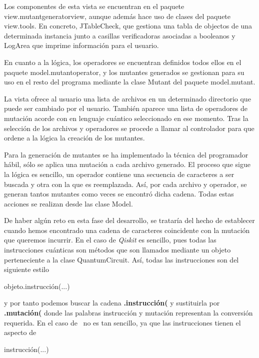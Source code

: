 Los componentes de esta vista se encuentran en el paquete view.mutantgeneratorview, aunque además hace uso de clases del paquete view.tools. En concreto, JTableCheck, que gestiona una tabla de  objectos de una determinada instancia junto a casillas verificadoras asociadas a booleanos y LogArea que imprime información para el usuario.

En cuanto a la lógica, los operadores se encuentran definidos todos ellos en el paquete model.mutantoperator, y los mutantes generados se gestionan para su uso en el resto del programa mediante la clase Mutant del paquete model.mutant.

La vista ofrece al usuario una lista de archivos en un determinado directorio que puede ser cambiado por el usuario. También aparece una lista de operadores de mutación acorde con en lenguaje cuántico seleccionado en ese momento. Tras la selección de los archivos y operadores se procede a llamar al controlador para que ordene a la lógica la creación de los mutantes.

Para la generación de mutantes se ha implementado la técnica del programador hábil, sólo se aplica una mutación a cada archivo generado. El proceso que sigue la lógica es sencillo, un operador contiene una secuencia de caracteres a ser buscada y otra con la que es reemplazada. Así, por cada archivo y operador, se generan tantos mutantes como veces se encontró dicha cadena. Todas estas acciones se realizan desde las clase Model.

De haber algún reto en esta fase del desarrollo, se trataría del hecho de establecer cuando hemos encontrado una cadena de caracteres coincidente con la mutación que queremos incurrir. En el caso de \textit{Qiskit} es sencillo, pues todas las instrucciones cuánticas son métodos que son llamados mediante un objeto perteneciente a la clase QuantumCircuit. Así, todas las instrucciones son del siguiente estilo

\begin{center}
objeto.instrucción(...)
\end{center}

y por tanto podemos buscar la cadena \textbf{.instrucción(} y sustituirla por \textbf{.mutación(} donde las palabras instrucción y mutación representan la conversión requerida. En el caso de \qsh\ no es tan sencillo, ya que las instrucciones tienen el aspecto de

\begin{center}
instrucción(...)
\end{center}

